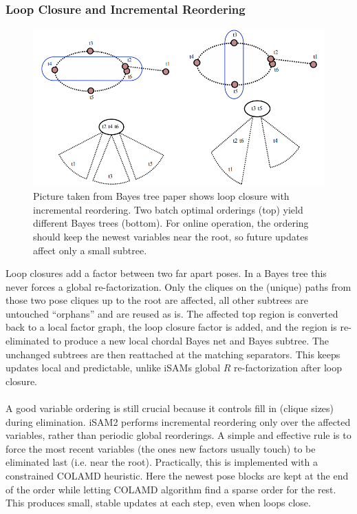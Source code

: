 \subsubsection{Loop Closure and Incremental Reordering}
\begin{figure}[H]
    \centering
    \includegraphics[width=0.98\linewidth]{Pictures/Optimizers/iSAM2/incremental_reordering.png}
    \caption{Picture taken from Bayes tree paper \cite{Bayes_tree_for_SLAM_paper} shows loop closure with incremental reordering. Two batch optimal orderings (top) yield different Bayes trees (bottom). For online operation, the ordering should keep the newest variables near the root, so future updates affect only a small subtree.}
    \label{fig:optimizer-iSAM2-incremental-reordering}
\end{figure}
\noindent
Loop closures add a factor between two far apart poses. In a Bayes tree this never forces a global re-factorization. Only the cliques on the (unique) paths from those two pose cliques up to the root are affected, all other subtrees are untouched ``orphans'' and are reused as is. The affected top region is converted back to a local factor graph, the loop closure factor is added, and the region is re-eliminated to produce a new local chordal Bayes net and Bayes subtree. The unchanged subtrees are then reattached at the matching separators. This keeps updates local and predictable, unlike iSAMs global $R$ re-factorization after loop closure. \cite{iSAM2_paper,Bayes_tree_for_SLAM_paper}
\\ \\
A good variable ordering is still crucial because it controls fill in (clique sizes) during elimination. iSAM2 performs incremental reordering only over the affected variables, rather than periodic global reorderings. A simple and effective rule is to force the most recent variables (the ones new factors usually touch) to be eliminated last (i.e. near the root). Practically, this is implemented with a constrained COLAMD heuristic. Here the newest pose blocks are kept at the end of the order while letting COLAMD algorithm find a sparse order for the rest. This produces small, stable updates at each step, even when loops close. \cite{Bayes_tree_for_SLAM_paper}
